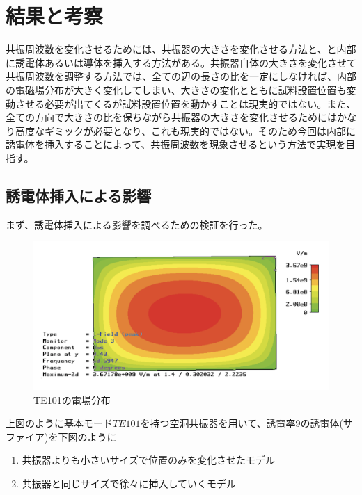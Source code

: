\chapter{結果と考察}
共振周波数を変化させるためには、共振器の大きさを変化させる方法と、と内部に誘電体あるいは導体を挿入する方法がある。共振器自体の大きさを変化させて共振周波数を調整する方法では、全ての辺の長さの比を一定にしなければ、内部の電磁場分布が大きく変化してしまい、大きさの変化とともに試料設置位置も変動させる必要が出てくるが試料設置位置を動かすことは現実的ではない。また、全ての方向で大きさの比を保ちながら共振器の大きさを変化させるためにはかなり高度なギミックが必要となり、これも現実的ではない。そのため今回は内部に誘電体を挿入することによって、共振周波数を現象させるという方法で実現を目指す。


\section{誘電体挿入による影響}
まず、誘電体挿入による影響を調べるための検証を行った。

\vspace{10 mm}

\begin{figure}[h]
  \begin{center}
    \includegraphics[width=12cm]{./image/te101.png}
    \caption{TE101の電場分布}
    \label{fig:E-TE101}
  \end{center}
\end{figure}

上図のように基本モード$TE101$を持つ空洞共振器を用いて、誘電率9の誘電体(サファイア)を下図のように

\begin{enumerate}
  \item 共振器よりも小さいサイズで位置のみを変化させたモデル
  \item 共振器と同じサイズで徐々に挿入していくモデル
\end{enumerate}

